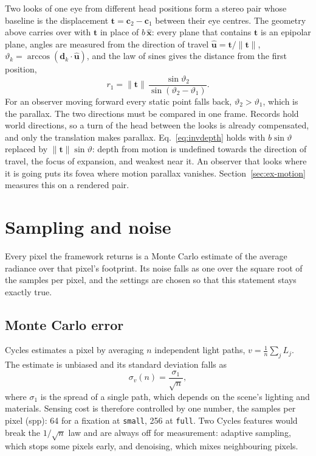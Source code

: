 \documentclass[11pt,a4paper]{article}
\newcommand{\code}[1]{\texttt{\small #1}}
\newcommand{\vb}[1]{\mathbf{#1}}
\begin{document}
Two looks of one eye from different head positions form a stereo pair whose baseline is the displacement
$\vb{t} = \vb{c}_2 - \vb{c}_1$ between their eye centres. The geometry above carries over with $\vb{t}$ in
place of $b\,\hat{\vb{x}}$: every plane that contains $\vb{t}$ is an epipolar plane, angles are measured from the
direction of travel $\hat{\vb{u}} = \vb{t}/\lVert\vb{t}\rVert$, $\vartheta_k = \arccos(\vb{d}_k\cdot\hat{\vb{u}})$,
and the law of sines gives the distance from the first position,
\begin{equation}\label{eq:motion}
r_1 = \lVert\vb{t}\rVert\,\frac{\sin\vartheta_2}{\sin(\vartheta_2 - \vartheta_1)} .
\end{equation}
For an observer moving forward every static point falls back, $\vartheta_2 > \vartheta_1$, which is the parallax.
The two directions must be compared in one frame. Records hold world directions, so a turn of the head between
the looks is already compensated, and only the translation makes parallax. Eq.~\eqref{eq:invdepth} holds with
$b\sin\vartheta$ replaced by $\lVert\vb{t}\rVert\sin\vartheta$: depth from motion is undefined towards the
direction of travel, the focus of expansion, and weakest near it. An observer that looks where it is going puts
its fovea where motion parallax vanishes. Section~\ref{sec:ex-motion} measures this on a rendered pair.

\section{Sampling and noise}\label{sec:noise}

Every pixel the framework returns is a Monte Carlo estimate of the average radiance over that pixel's footprint.
Its noise falls as one over the square root of the samples per pixel, and the settings are chosen so that this
statement stays exactly true.

\subsection{Monte Carlo error}\label{sec:mc}

Cycles estimates a pixel by averaging $n$ independent light paths, $v = \frac1n\sum_j L_j$. The estimate is
unbiased and its standard deviation falls as
\begin{equation}\label{eq:mc}
\sigma_v(n) = \frac{\sigma_1}{\sqrt{n}},
\end{equation}
where $\sigma_1$ is the spread of a single path, which depends on the scene's lighting and materials. Sensing cost
is therefore controlled by one number, the samples per pixel (spp): 64 for a fixation at \code{small}, 256 at
\code{full}. Two Cycles features would break the $1/\sqrt{n}$ law and are always off for measurement: adaptive
sampling, which stops some pixels early, and denoising, which mixes neighbouring pixels.
\end{document}

